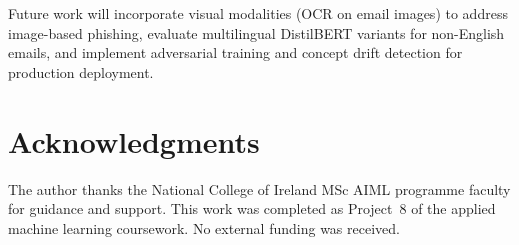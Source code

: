\documentclass[conference]{IEEEtran}
\begin{document}
Future work will incorporate visual modalities (OCR on email images) to
address image-based phishing, evaluate multilingual DistilBERT variants
for non-English emails, and implement adversarial training and concept
drift detection for production deployment.

\section*{Acknowledgments}
The author thanks the National College of Ireland MSc AIML programme faculty
for guidance and support. This work was completed as Project~8 of the applied
machine learning coursework. No external funding was received.



\end{document}
